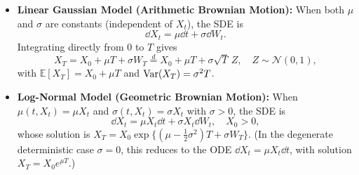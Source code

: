 \begin{itemize}
    \item \textbf{Linear Gaussian Model (Arithmetic Brownian Motion):} When both $\mu$ and $\sigma$ are constants (independent of $X_t$), the SDE is
    \[
    \dd X_t = \mu \dd t + \sigma \dd W_t.
    \]
    Integrating directly from $0$ to $T$ gives
    \[
    X_T = X_0 + \mu T + \sigma W_T \stackrel{d}{=} X_0 + \mu T + \sigma \sqrt{T}\, Z, \quad Z \sim \mathcal{N}(0, 1),
    \]
    with $\mathbb{E}[X_T] = X_0 + \mu T$ and $\operatorname{Var}(X_T) = \sigma^2 T$.

    \item \textbf{Log-Normal Model (Geometric Brownian Motion):} When $\mu(t, X_t) = \mu X_t$ and $\sigma(t, X_t) = \sigma X_t$ with $\sigma > 0$, the SDE is
    \[
    \dd X_t = \mu X_t \dd t + \sigma X_t \dd W_t, \quad X_0 > 0,
    \]
    whose solution is $X_T = X_0 \exp\big\{(\mu - \frac{1}{2}\sigma^2)T + \sigma W_T\big\}$. (In the degenerate deterministic case $\sigma = 0$, this reduces to the ODE $\dd X_t = \mu X_t \dd t$, with solution $X_T = X_0 e^{\mu T}$.)
\end{itemize}

